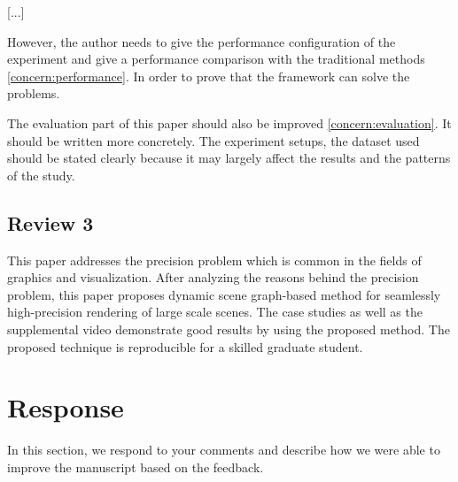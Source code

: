 \documentclass{article}
\begin{document}
[...]

However, the author needs to give the performance configuration of the experiment and give a performance comparison with the traditional methods \eqref{concern:performance}. 
In order to prove that the framework can solve the problems.
    
The evaluation part of this paper should also be improved \eqref{concern:evaluation}.
It should be written more concretely.
The experiment setups, the dataset used should be stated clearly because it may largely affect the results and the patterns of the study.

\subsection*{Review 3}

This paper addresses the precision problem which is common in the fields of graphics and visualization.
After analyzing the reasons behind the precision problem, this paper proposes dynamic scene graph-based method for seamlessly high-precision rendering of large scale scenes.
The case studies as well as the supplemental video demonstrate good results by using the proposed method.
The proposed technique is reproducible for a skilled graduate student.



\section{Response}
In this section, we respond to your comments and describe how we were able to improve the manuscript based on the feedback.





\end{document}
